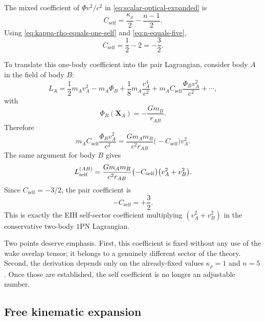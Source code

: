 \documentclass[11pt]{article}
\newcommand{\krho}{\kappa_{\rho}}
\newcommand{\PhiN}{\Phi}
\newcommand{\Cself}{C_{\mathrm{self}}}
\begin{document}
The mixed coefficient of \(\PhiN v^2/c^2\) in
\eqref{eq:scalar-optical-expanded} is
\begin{equation}
\Cself
=
\frac{\krho}{2}-\frac{n-1}{2}.
\label{eq:self-coeff-general}
\end{equation}
Using \eqref{eq:kappa-rho-equals-one-self} and \eqref{eq:n-equals-five},
\begin{equation}
\Cself
=
\frac12 - 2
=
-\frac32.
\label{eq:self-coeff-minus-three-halves}
\end{equation}

To translate this one-body coefficient into the pair Lagrangian, consider body \(A\) in
the field of body \(B\):
\begin{equation}
L_A
=
\frac12 m_A v_A^2
- m_A\Phi_B
+ \frac18 m_A\frac{v_A^4}{c^2}
+ m_A \Cself \frac{\Phi_B v_A^2}{c^2}
+\cdots,
\label{eq:body-A-self-expansion}
\end{equation}
with
\begin{equation}
\Phi_B(\mathbf X_A)=-\frac{Gm_B}{r_{AB}}.
\label{eq:phi-B-at-A}
\end{equation}
Therefore
\begin{equation}
m_A \Cself \frac{\Phi_B v_A^2}{c^2}
=
\frac{Gm_A m_B}{c^2 r_{AB}}
\bigl(-\Cself\bigr)v_A^2.
\label{eq:self-sign-translation-A}
\end{equation}
The same argument for body \(B\) gives
\begin{equation}
L_{\rm self}^{(AB)}
=
\frac{Gm_A m_B}{c^2 r_{AB}}
\bigl(-\Cself\bigr)\bigl(v_A^2+v_B^2\bigr).
\label{eq:self-pair-term-general}
\end{equation}
Since \(\Cself=-3/2\), the pair coefficient is
\begin{equation}
-\Cself=+\frac32.
\label{eq:self-pair-coeff-plus-three-halves}
\end{equation}
This is exactly the EIH self-sector coefficient multiplying
\((v_A^2+v_B^2)\) in the conservative two-body \(1\)PN Lagrangian.

Two points deserve emphasis. First, this coefficient is fixed without any use of the wake
overlap tensor; it belongs to a genuinely different sector of the theory. Second, the
derivation depends only on the already-fixed values \(\krho=1\) and \(n=5\). Once those are
established, the self coefficient is no longer an adjustable number.

\subsection{Free kinematic expansion}
\label{sec:kinematic-expansion}
\end{document}
